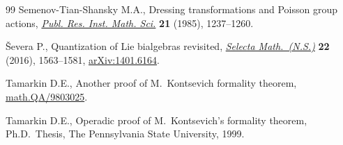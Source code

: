 \documentclass[10pt,a4paper]{amsart}
\numberwithin{equation}{section}
\theoremstyle{definition}
\begin{document}
\begin{thebibliography}{99}
Semenov-Tian-Shansky M.A., Dressing transformations and {P}oisson group
 actions, \href{http://dx.doi.org/10.2977/prims/1195178514}{\textit{Publ. Res. Inst. Math. Sci.}} \textbf{21} (1985), 1237--1260.

{\v{S}}evera P., Quantization of {L}ie bialgebras revisited, \href{http://dx.doi.org/10.1007/s00029-016-0227-0}{\textit{Selecta
 Math.~(N.S.)}} \textbf{22} (2016), 1563--1581, \href{http://arxiv.org/abs/1401.6164}{arXiv:1401.6164}.

Tamarkin D.E., Another proof of {M}.~{K}ontsevich formality theorem,
 \href{http://arxiv.org/abs/math.QA/9803025}{math.QA/9803025}.

Tamarkin D.E., Operadic proof of {M}.~{K}ontsevich's formality theorem, Ph.D.~Thesis, The Pennsylvania State University, 1999.

\end{thebibliography}
\end{document}
